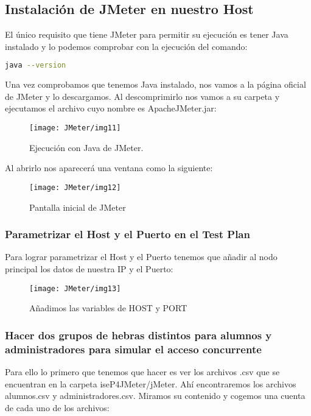 \subsection{Instalación de JMeter en nuestro Host}

El único requisito que tiene JMeter para permitir su ejecución es tener Java instalado y lo podemos comprobar con la ejecución del comando:

\begin{lstlisting}[language=bash]
    java --version
\end{lstlisting}

Una vez comprobamos que tenemos Java instalado, nos vamos a la página oficial de JMeter y lo descargamos. Al descomprimirlo nos vamos a su carpeta y ejecutamos el archivo cuyo nombre es ApacheJMeter.jar:

\begin{figure}[H]
    \centering
    \texttt{[image: JMeter/img11]}
    \caption{Ejecución con Java de JMeter.}
\end{figure}

Al abrirlo nos aparecerá una ventana como la siguiente:

\begin{figure}[H]
    \centering
    \texttt{[image: JMeter/img12]}
    \caption{Pantalla inicial de JMeter}
\end{figure}

\subsubsection{Parametrizar el Host y el Puerto en el Test Plan}

Para lograr parametrizar el Host y el Puerto tenemos que añadir al nodo principal los datos de nuestra IP y el Puerto:

\begin{figure}[H]
    \centering
    \texttt{[image: JMeter/img13]}
    \caption{Añadimos las variables de HOST y PORT}
\end{figure}

\subsubsection{Hacer dos grupos de hebras distintos para alumnos y administradores para simular el acceso concurrente}

Para ello lo primero que tenemos que hacer es ver los archivos .csv que se encuentran en la carpeta iseP4JMeter/jMeter. Ahí encontraremos los archivos alumnos.csv y administradores.csv. Miramos su contenido y cogemos una cuenta de cada uno de los archivos:


